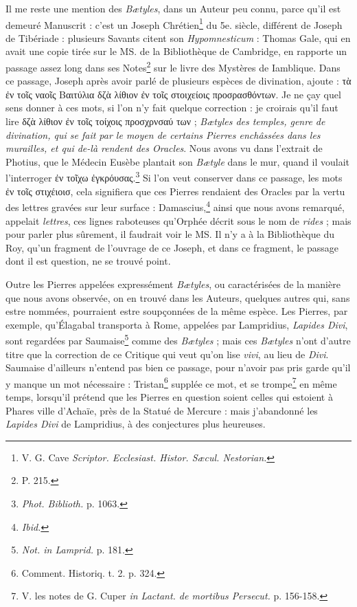 \documentclass[a4paper, 11pt, oneside, polutonikogreek, french, landscape]{article}
\begin{document}
Il me reste une mention des \emph{Bætyles}, dans un Auteur peu connu, parce qu'il est demeuré Manuscrit : c'est un Joseph Chrétien\footnote{V. G. Cave \emph{Scriptor. Ecclesiast. Histor. Sæcul. Nestorian.}} du 5e. siècle, différent de Joseph de Tibériade : plusieurs Savants citent son \emph{Hypomnesticum} : Thomas Gale, qui en avait une copie tirée sur le MS. de la Bibliothèque de Cambridge, en rapporte un passage assez long dans ses Notes\footnote{P. 215.} sur le livre des Mystères de Iamblique. Dans ce passage, Joseph après avoir parlé de plusieurs espèces de divination, ajoute : τὰ ἐν τοῖς ναοῖς Βαιτύλια δζὰ λίθιον ἐν τοῖς στοιχείοις προσρασθόντων. Je ne çay quel sens donner à ces mots, si l'on n'y fait quelque correction : je croirais qu'il faut lire δζὰ λίθιον ἐν τοῖς τοίχοις προσχρνσαύ των ; \emph{Bætyles des temples, genre de divination, qui se fait par le moyen de certains Pierres enchâssées dans les murailles, et qui de-là rendent des Oracles}. Nous avons vu dans l'extrait de Photius, que le Médecin Eusèbe plantait son \emph{Bætyle} dans le mur, quand il voulait l'interroger ἐν τοῖχω ἐγκρόυσας.\footnote{\emph{Phot. Biblioth.} p. 1063.} Si l'on veut conserver dans ce passage, les mots ἐν τοῖς στιχέιοισ, cela signifiera que ces Pierres rendaient des Oracles par la vertu des lettres gravées sur leur surface : Damascius,\footnote{\emph{Ibid.}} ainsi que nous avons remarqué, appelait \emph{lettres}, ces lignes raboteuses qu'Orphée décrit sous le nom de \emph{rides} ; mais pour parler plus sûrement, il faudrait voir le MS. Il n'y a à la Bibliothèque du Roy, qu'un fragment de l'ouvrage de ce Joseph, et dans ce fragment, le passage dont il est question, ne se trouvé point.

Outre les Pierres appelées expressément \emph{Bætyles}, ou caractérisées de la manière que nous avons observée, on en trouvé dans les Auteurs, quelques autres qui, sans estre nommées, pourraient estre soupçonnées de la même espèce. Les Pierres, par exemple, qu'Élagabal transporta à Rome, appelées par Lampridius, \emph{Lapides Divi}, sont regardées par Saumaise\footnote{\emph{Not. in Lamprid.} p. 181.} comme des \emph{Bætyles} ; mais ces \emph{Bætyles} n'ont d'autre titre que la correction de ce Critique qui veut qu'on lise \emph{vivi}, au lieu de \emph{Divi}. Saumaise d'ailleurs n'entend pas bien ce passage, pour n'avoir pas pris garde qu'il y manque un mot nécessaire : Tristan\footnote{Comment. Historiq. t. 2. p. 324.} supplée ce mot, et se trompe\footnote{V. les notes de G. Cuper \emph{in Lactant. de mortibus Persecut.} p. 156-158.} en même temps, lorsqu'il prétend que les Pierres en question soient celles qui estoient à Phares ville d'Achaïe, près de la Statué de Mercure : mais j'abandonné les \emph{Lapides Divi} de Lampridius, à des conjectures plus heureuses.
\end{document}
